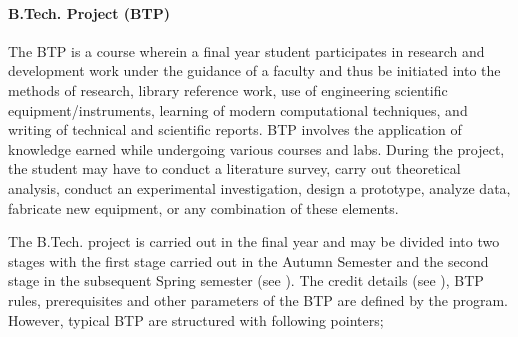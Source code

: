 \paragraph{B.Tech. Project (BTP)} The BTP is a course wherein a final year \gls{student} participates in research and development work under the guidance of a \gls{faculty} and thus be initiated into the methods of research, library reference work, use of engineering scientific equipment/instruments, learning of modern computational techniques, and writing of technical and scientific reports. BTP involves the application of knowledge earned while undergoing various courses and labs. During the project, the student may have to conduct a literature survey, carry out theoretical analysis, conduct an experimental investigation, design a prototype, analyze data, fabricate new equipment, or any combination of these elements.

The B.Tech. project is carried out in the final year and may be divided into two stages with the first stage carried out in the Autumn Semester and the second stage in the subsequent Spring semester (see ). The credit details (see ), BTP rules, prerequisites and other parameters of the BTP are defined by the program. However, typical BTP are structured with following pointers; 

